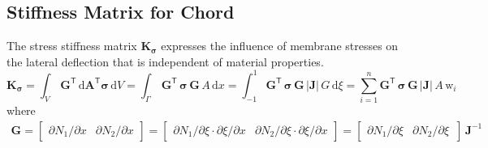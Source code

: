 \subsection{Stiffness Matrix for Chord}
The stress stiffness matrix $\mathbf{K}_{\boldsymbol{\sigma}}$ expresses the influence of membrane stresses on the lateral deflection that is independent of material properties.
\begin{equation}
\mathbf{K}_{\boldsymbol{\sigma}} = \int_{V} \, \mathbf{G}^{\mathsf{T}} \, \mathrm{d} \mathbf{A}^{\mathsf{T}} \boldsymbol{\sigma} \, \mathrm{d} V = \int_{\Gamma} \, \mathbf{G}^{\mathsf{T}} \,  \boldsymbol{\sigma} \, \mathbf{G} \, A \, \mathrm{d} x 
= \int_{-1}^{1} \mathbf{G}^{\mathsf{T}} \,  \boldsymbol{\sigma} \, \mathbf{G} \, |\mathbf{J}|  \, G \,  \mathrm{d} \xi =  \sum_{i=1}^{n}  \mathbf{G}^{\mathsf{T}} \,  \boldsymbol{\sigma} \, \mathbf{G}  \, |\mathbf{J}| \, A \, \mathrm{w}_i
\end{equation}
where 
\begin{equation}
\begin{aligned}
\mathbf{G} = \begin{bmatrix}
\partial N_1 / \partial x & \partial N_2 / \partial x
\end{bmatrix} = \begin{bmatrix}
\partial N_1 / \partial \xi \cdot \partial \xi / \partial x &  \partial N_2 / \partial \xi \cdot \partial \xi / \partial x
\end{bmatrix} = \begin{bmatrix}
\partial N_1 / \partial \xi &  \partial N_2 / \partial \xi \, 
\end{bmatrix} \, \mathbf{J}^{-1}
\end{aligned}
\end{equation}


